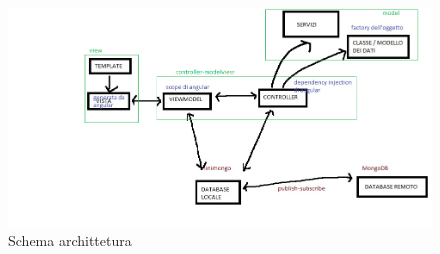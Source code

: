 \begin{figure}[h]
\begin{center}
\includegraphics[scale=0.40]{img/architettura.png}
\caption{Schema archittetura}
\end{center}
\end{figure}

